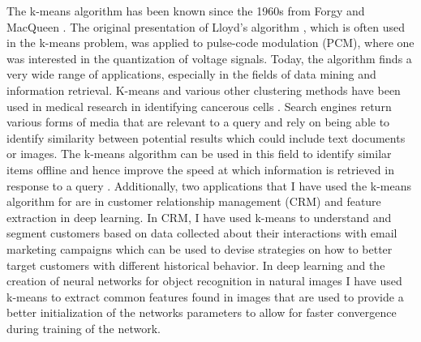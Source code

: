 \documentclass[10pt,twocolumn,letterpaper]{article}
\begin{document}
The k-means algorithm has been known since the 1960s from Forgy \cite{forgy} and MacQueen \cite{macqueen}. The original presentation of Lloyd's algorithm \cite{lloyd1982least}, which is often used in the k-means problem, was applied to pulse-code modulation (PCM), where one was interested in the quantization of voltage signals. Today, the algorithm finds a very wide range of applications, especially in the fields of data mining and information retrieval. K-means and various other clustering methods have been used in medical research in identifying cancerous cells \cite{wang}. Search engines return various forms of media that are relevant to a query and rely on being able to identify similarity between potential results which could include text documents or images. The k-means algorithm can be used in this field to identify similar items offline and hence improve the speed at which information is retrieved in response to a query \cite{liu}. Additionally, two applications that I have used the k-means algorithm for are in customer relationship management (CRM) and feature extraction in deep learning. In CRM, I have used k-means to understand and segment customers based on data collected about their interactions with email marketing campaigns which can be used to devise strategies on how to better target customers with different historical behavior. In deep learning and the creation of neural networks for object recognition in natural images I have used k-means to extract common features found in images that are used to provide a better initialization of the networks parameters to allow for faster convergence during training of the network.
\end{document}
